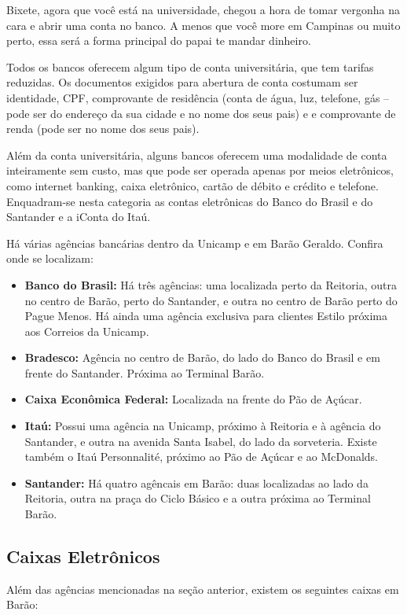 Bixete, agora que você está na universidade, chegou a hora de tomar vergonha na
cara e abrir uma conta no banco. A menos que você more em Campinas ou muito
perto, essa será a forma principal do papai te mandar dinheiro.

Todos os bancos oferecem algum tipo de conta universitária, que tem tarifas
reduzidas. Os documentos exigidos para abertura de conta costumam ser
identidade, CPF, comprovante de residência (conta de água, luz, telefone, gás
-- pode ser do endereço da sua cidade e no nome dos seus pais) e e comprovante
de renda (pode ser no nome dos seus pais).

Além da conta universitária, alguns bancos oferecem uma modalidade de conta
inteiramente sem custo, mas que pode ser operada apenas por meios eletrônicos,
como internet banking, caixa eletrônico, cartão de débito e crédito e telefone.
Enquadram-se nesta categoria as contas eletrônicas do Banco do Brasil e do
Santander e a iConta do Itaú.

Há várias agências bancárias dentro da Unicamp e em Barão Geraldo. Confira onde
se localizam:

\begin{itemize}
\item \textbf{Banco do Brasil:} Há três agências: uma localizada perto da
  Reitoria, outra no centro de Barão, perto do Santander, e outra no centro de
  Barão perto do Pague Menos. Há ainda uma agência exclusiva para clientes
  Estilo próxima aos Correios da Unicamp.

\item \textbf{Bradesco:} Agência no centro de Barão, do lado do Banco do Brasil
  e em frente do Santander. Próxima ao Terminal Barão.

\item \textbf{Caixa Econômica Federal:} Localizada na frente do Pão de Açúcar.

\item \textbf{Itaú:} Possui uma agência na Unicamp, próximo à Reitoria e à
  agência do Santander, e outra na avenida Santa Isabel, do lado da sorveteria.
  Existe também o Itaú Personnalité, próximo ao Pão de Açúcar e ao McDonalds.

\item \textbf{Santander:} Há quatro agêncais em Barão: duas localizadas ao lado
  da Reitoria, outra na praça do Ciclo Básico e a outra próxima ao Terminal
  Barão.
\end{itemize}

\subsection{Caixas Eletrônicos}
Além das agências mencionadas na seção anterior, existem os seguintes caixas em
Barão:

